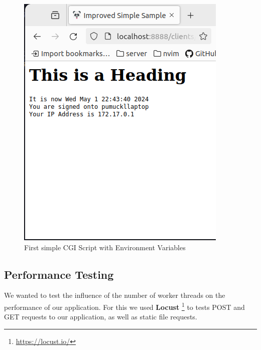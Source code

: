 \begin{figure}[h]
\begin{minipage}{0.35\textwidth}
        \includegraphics[width=\textwidth]{figures/cgi.png}
        \caption{First simple CGI Script with Environment Variables}
    \end{minipage}
\end{figure}
\vspace{-15pt}
\subsection*{Performance Testing}
We wanted to test the influence of the number of worker threads on the performance of our application. For this we used \textbf{Locust} \footnote{\url{https://locust.io/}} to tests POST and GET requests to our application, as well as static file requests. 

